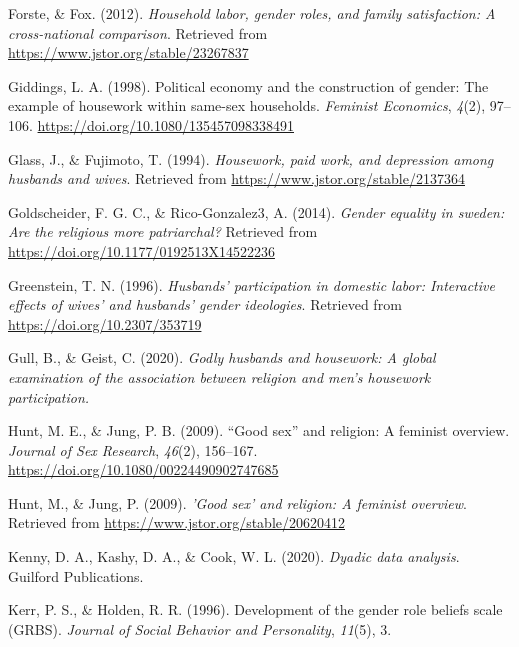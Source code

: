 \documentclass[
  man,floatsintext]{apa6}
\newlength{\cslhangindent}
\newlength{\cslentryspacingunit} %
\newenvironment{CSLReferences}[2] %
 {%
  \setlength{\parindent}{0pt}
  \ifodd #1
  \let\oldpar\par
  \def\par{\hangindent=\cslhangindent\oldpar}
  \fi
  \setlength{\parskip}{#2\cslentryspacingunit}
 }%
 {}
\begin{document}
\begin{CSLReferences}{1}{0}
\leavevmode{}%
Forste, \& Fox. (2012). \emph{Household labor, gender roles, and family satisfaction: A cross-national comparison}. Retrieved from \url{https://www.jstor.org/stable/23267837}

\leavevmode{}%
Giddings, L. A. (1998). Political economy and the construction of gender: The example of housework within same-sex households. \emph{Feminist Economics}, \emph{4}(2), 97--106. \url{https://doi.org/10.1080/135457098338491}

\leavevmode{}%
Glass, J., \& Fujimoto, T. (1994). \emph{Housework, paid work, and depression among husbands and wives}. Retrieved from \url{https://www.jstor.org/stable/2137364}

\leavevmode{}%
Goldscheider, F. G. C., \& Rico-Gonzalez3, A. (2014). \emph{Gender equality in sweden: Are the religious more patriarchal?} Retrieved from \url{https://doi.org/10.1177/0192513X14522236}

\leavevmode{}%
Greenstein, T. N. (1996). \emph{Husbands' participation in domestic labor: Interactive effects of wives' and husbands' gender ideologies}. Retrieved from \url{https://doi.org/10.2307/353719}

\leavevmode{}%
Gull, B., \& Geist, C. (2020). \emph{Godly husbands and housework: A global examination of the association between religion and men's housework participation.}

\leavevmode{}%
Hunt, M. E., \& Jung, P. B. (2009). {``Good sex''} and religion: A feminist overview. \emph{Journal of Sex Research}, \emph{46}(2), 156--167. \url{https://doi.org/10.1080/00224490902747685}

\leavevmode{}%
Hunt, M., \& Jung, P. (2009). \emph{'Good sex' and religion: A feminist overview}. Retrieved from \url{https://www.jstor.org/stable/20620412}

\leavevmode{}%
Kenny, D. A., Kashy, D. A., \& Cook, W. L. (2020). \emph{Dyadic data analysis}. Guilford Publications.

\leavevmode{}%
Kerr, P. S., \& Holden, R. R. (1996). Development of the gender role beliefs scale (GRBS). \emph{Journal of Social Behavior and Personality}, \emph{11}(5), 3.


\end{CSLReferences}
\end{document}
